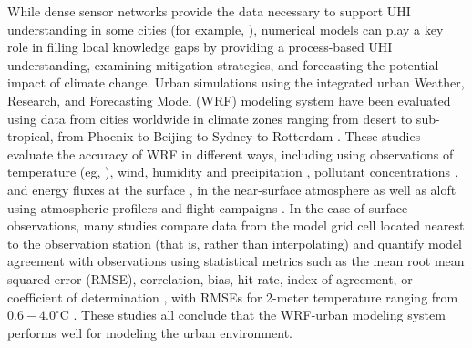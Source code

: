 \documentclass[draft,linenumbers]{agujournal}
\begin{document}
While dense sensor networks provide the data necessary to support UHI understanding in some cities (for example, \cite{tokyoUHI,madisonUHI,minneapolisUHI, scott2017intraurban,scott2017temperature}), numerical models can play a key role in filling local knowledge gaps by providing a process-based UHI understanding, examining mitigation strategies, and forecasting the potential impact of climate change. 
Urban simulations using the integrated urban Weather, Research, and Forecasting Model (WRF) modeling system \citep{chen2011integrated} have been evaluated using data from cities worldwide in climate zones ranging from desert to sub-tropical, from Phoenix \citep{georgescu2013summer} to Beijing \citep{wang2013modeling} to Sydney \citep{argueso2014temperature} to Rotterdam \citep{theeuwes2014seasonal}. 
These studies evaluate the accuracy of WRF in different ways,
including using observations of temperature (eg, \citet{kusaka2012numerical}), wind, humidity and precipitation \citep{miao2011impacts,chen2011numerical}, pollutant concentrations \citep{brioude2013top}, and energy fluxes at the surface \citep{yang2015enhancing,loridan2012multi}, in the near-surface atmosphere as well as aloft using atmospheric profilers and flight campaigns \citep{li2013development}. 
In the case of surface observations, many studies compare data from the model grid cell located nearest to the observation station (that is, rather than interpolating) and quantify model agreement with observations using statistical metrics such as the mean root mean squared error (RMSE), correlation, bias, hit rate, index of agreement, or coefficient of determination \citep{loridan2010trade,salamanca2011study,lee2011evaluation,chen2011numerical,chen2014wrf,li2013multi}, with RMSEs for 2-meter temperature ranging from $0.6-4.0^\circ$C \citep{kim2013evaluation}. These studies 
all conclude that the WRF-urban modeling system performs well for modeling the urban environment. %
\end{document}
